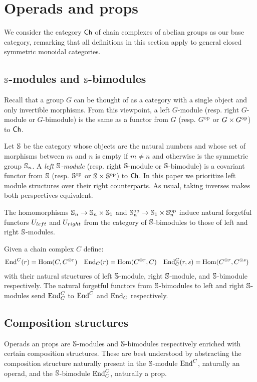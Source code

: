 \section{Operads and props}

We consider the category $\Ch$ of chain complexes of abelian groups as our base category, remarking that all definitions in this section apply to general closed symmetric monoidal categories.

\subsection{$\S$-modules and $\S$-bimodules}
Recall that a group $G$ can be thought of as a category with a single object and only invertible morphisms. From this viewpoint, a left $G$-module (resp. right $G$-module or $G$-bimodule) is the same as a functor from $G$ (resp. $G^\op$ or $G \times G^\op$) to $\Ch$.

Let $\S$ be the category whose objects are the natural numbers and whose set of morphisms between $m$ and $n$ is empty if $m \neq n$ and otherwise is the symmetric group $\S_n$.
A \textit{left $\S$-module} (resp. right $\S$-module or $\S$-bimodule) is a covariant functor from $\S$ (resp. $\S^\op$ or $\S \times \S^\op$) to $\Ch$. In this paper we prioritize left module structures over their right counterparts. As usual, taking inverses makes both perspectives equivalent.

The homomorphisms $\S_n \to \S_n \times \S_1$ and $\S_n^\op \to \S_1 \times \S_n^\op$ induce natural forgetful functors $\Uleft$ and $\Uright$ from the category of $\S$-bimodules to those of left and right $\S$-modules.

Given a chain complex $C$ define:
\begin{align*}
\End^C(r) &= \Hom(C, C^{\otimes r})
& \End_C(r) &= \Hom(C^{\otimes r}, C)
&\End^C_C(r, s) &= \Hom(C^{\otimes r}, C^{\otimes s})
\end{align*}
with their natural structures of left $\S$-module, right $\S$-module, and $\S$-bimodule respectively.
The natural forgetful functors from $\S$-bimodules to left and right $\S$-modules send $\End^C_C$ to $\End^C$ and $\End_C$ respectively.

\subsection{Composition structures}

Operads an props are $\S$-modules and \mbox{$\S$-bimodules} respectively enriched with certain composition structures. These are best understood by abstracting the composition structure naturally present in the $\S$-module $\End^C$, naturally an operad, and the $\S$-bimodule $\End^C_C$, naturally a prop.

